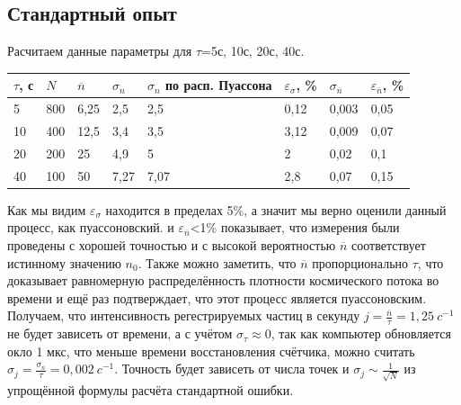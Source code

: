 \documentclass[12pt,a4paper]{article}
\begin{document}
\subsection{Стандартный опыт}
Расчитаем данные параметры для $\tau$=5с, 10с, 20с, 40с.
\begin{table}[!ht]
    \centering
    \begin{tabular}{|l|l|l|l|p{2.1cm}|l|l|l|}
    \hline
        $\tau$, с & $N$ & $\overline{n}$ & $\sigma_{n}$ & $\sigma_{n}$ по расп. Пуассона & $\varepsilon_{\sigma}$, \% & $\sigma_{\overline{n}}$ & $\varepsilon_{\overline{n}}$, \% \\ \hline
        5  & 800 & 6,25 & 2,5 & 2,5 & 0,12 & 0,003 & 0,05 \\ \hline
        10 & 400 & 12,5 & 3,4 & 3,5 & 3,12 & 0,009 & 0,07 \\ \hline
        20 & 200 & 25 & 4,9 & 5 & 2 & 0,02 & 0,1 \\ \hline
        40 & 100 & 50 & 7,27 & 7,07 & 2,8 & 0,07 & 0,15 \\ \hline
    \end{tabular}
\end{table}
Как мы видим $\varepsilon_{\sigma}$  находится в пределах 5\%, а значит мы верно оценили данный процесс, как пуассоновский. и $\varepsilon_{\overline{n}}$<1\% показывает, что измерения были проведены с хорошей точностью и с высокой вероятностью $\overline{n}$ соответствует истинному значению $n_0$. Также можно заметить, что $\overline{n}$ пропорционально $\tau$, что доказывает равномерную распределённость плотности космического потока во времени и ещё раз подтверждает, что этот процесс является пуассоновским. Получаем, что интенсивность регестрируемых частиц в секунду $j=\frac{\overline{n}}{\tau}=1,25~c^{-1}$ не будет зависеть от времени, а с учётом $\sigma_{\tau} \approx 0$, так как компьютер обновляется окло 1 мкс, что меньше времени восстановления счётчика, можно считать $\sigma_j=\frac{\sigma_{\overline{n}}}{\tau}=0,002~c^{-1}$. Точность будет зависеть от числа точек и  $\sigma_j \sim \frac{1}{\sqrt{N}}$ из упрощённой формулы расчёта стандартной ошибки.
\end{document}
